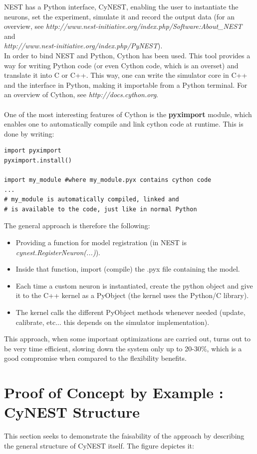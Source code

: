 \documentclass{article}
\begin{document}
NEST has a Python interface, CyNEST, enabling the user to instantiate the neurons, set the experiment, simulate it and record the output data (for an overview, see \emph{http://www.nest-initiative.org/index.php/Software:About\_NEST} and \\ \emph{http://www.nest-initiative.org/index.php/PyNEST}). \\
In order to bind NEST and Python, Cython has been used. This tool provides a way for writing Python code (or even Cython code, which is an overset) and translate it into C or C++. This way, one can write the simulator core in C++ and the interface in Python, making it importable from a Python terminal. For an overview of Cython, see \emph{http://docs.cython.org}.\\ \\

One of the most interesting features of Cython is the \textbf{pyximport} module, which enables one to automatically compile and link cython code at runtime. This is done by writing:
\begin{verbatim}
import pyximport
pyximport.install()

import my_module #where my_module.pyx contains cython code
... 
# my_module is automatically compiled, linked and 
# is available to the code, just like in normal Python
\end{verbatim}

The general approach is therefore the following:
\begin{itemize}
\item Providing a function for model registration (in NEST is \emph{cynest.RegisterNeuron(...)}).
\item Inside that function, import (compile) the .pyx file containing the model.
\item Each time a custom neuron is instantiated, create the python object and give it to the C++ kernel as a PyObject (the kernel uses the Python/C library).
\item The kernel calls the different PyObject methods whenever needed (update, calibrate, etc... this depends on the simulator implementation).
\end{itemize}
This approach, when some important optimizations are carried out, turns out to be very time efficient, slowing down the system only up to 20-30\%, which is a good compromise when compared to the flexibility benefits.

\section{Proof of Concept by Example : CyNEST Structure}
This section seeks to demonstrate the faisability of the approach by describing the general structure of CyNEST itself. The figure depictes it:
\end{document}
